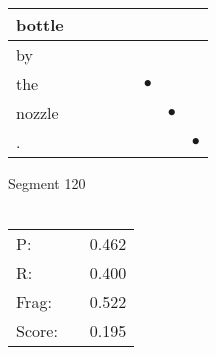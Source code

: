 \documentclass[landscape]{article}
\newcommand{\ssp}{\hspace{2pt}}
\newcommand{\mex}{\cellcolor{g}$\bullet$}
\begin{document}
\begin{tabular}{|l|p{10pt}|p{10pt}|p{10pt}|p{10pt}|p{10pt}|p{10pt}|p{10pt}|}
\hline
\ssp bottle \ssp&\hspace{2pt}&\hspace{2pt}&\hspace{2pt}&\hspace{2pt}&\hspace{2pt}&\hspace{2pt}&\hspace{2pt}\\
\hline
\ssp by \ssp&\hspace{2pt}&\hspace{2pt}&\hspace{2pt}&\hspace{2pt}&\hspace{2pt}&\hspace{2pt}&\hspace{2pt}\\
\hline
\ssp \cellcolor{ref4}the \ssp&\hspace{2pt}&\hspace{2pt}&\hspace{2pt}&\hspace{2pt}&\hspace{2pt}\mex&\hspace{2pt}&\hspace{2pt}\\
\hline
\ssp \cellcolor{ref5}nozzle \ssp&\hspace{2pt}&\hspace{2pt}&\hspace{2pt}&\hspace{2pt}&\hspace{2pt}&\hspace{2pt}\mex&\hspace{2pt}\\
\hline
\ssp \cellcolor{ref6}. \ssp&\hspace{2pt}&\hspace{2pt}&\hspace{2pt}&\hspace{2pt}&\hspace{2pt}&\hspace{2pt}&\hspace{2pt}\mex\\
\hline
\end{tabular}

\vspace{6pt}
\noindent Segment 120\\\\
\noindent\begin{tabular}{lm{12pt}r}
\hline
P:&&0.462\\
R:&&0.400\\
Frag:&&0.522\\
Score:&&0.195\\
\end{tabular}
\end{document}
